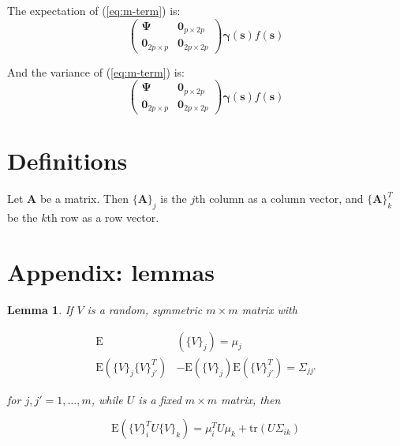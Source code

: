 \documentclass[authoryear, review, 11pt]{elsarticle}
\newtheorem{lemma}[theorem]{Lemma}
\begin{document}
        The expectation of (\ref{eq:m-term}) is:
        \begin{equation*}
            \left( \begin{array}{cc} \bm{\Psi}  & \bm{0}_{p \times 2p} \\ \bm{0}_{2p \times p} & \bm{0}_{2p \times 2p} \end{array} \right) \bm{\gamma}(\bm{s}) f(\bm{s})
        \end{equation*}
    
        And the variance of (\ref{eq:m-term}) is:
        \begin{equation*}
            \left( \begin{array}{cc} \bm{\Psi}  & \bm{0}_{p \times 2p} \\ \bm{0}_{2p \times p} & \bm{0}_{2p \times 2p} \end{array} \right) \bm{\gamma}(\bm{s}) f(\bm{s})
        \end{equation*}
  
  
    \section{Definitions}
        Let $\bm{A}$ be a matrix. Then $\{ \bm{A} \}_j$ is the $j$th column as a column vector, and $\{ \bm{A} \}_k^T$ be the $k$th row as a row vector.


    \section{Appendix: lemmas}
        \begin{lemma} \label{lemma:semiquadratic}
            If $V$ is a random, symmetric $m \times m$ matrix with 

            \begin{align*}
                \text{E} &\left( \{ V \}_j \right) = \mu_j \\
                \text{E} \left( \{ V \}_j \{ V \}_{j'}^T \right) &- \text{E} \left( \{ V \}_j \right) \text{E} \left( \{ V \}_{j'}^T \right) = \Sigma_{jj'}
            \end{align*}

            for $j,  j' = 1, \dots, m$, while $U$ is a fixed $m \times m$ matrix, then 

            \begin{equation*}
                \text{E} \left( \{ V \}_i^T U \{ V \}_k \right) = \mu_i^T U  \mu_k + \text{tr} \left( U \Sigma_{ik} \right)
            \end{equation*}
        \end{lemma}
\end{document}
